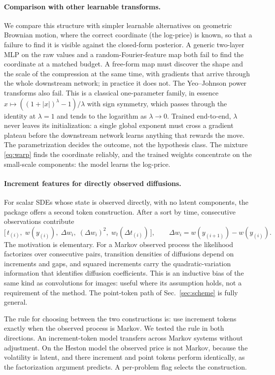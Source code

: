 \documentclass[10pt]{article}
\begin{document}
\paragraph{Comparison with other learnable transforms.} We compare this structure with simpler
learnable alternatives on geometric Brownian motion, where the correct coordinate (the log-price) is
known, so that a failure to find it is visible against the closed-form posterior. A generic two-layer
MLP on the raw values and a random-Fourier-feature map both fail to find the coordinate at a matched
budget. A free-form map must discover the shape and the scale of the compression at the same time,
with gradients that arrive through the whole downstream network; in practice it does not. The
Yeo--Johnson power transforms \citep{yeo2000} also fail. This is a classical one-parameter family, in
essence $x \mapsto ((1+|x|)^{\lambda} - 1)/\lambda$ with sign symmetry, which passes through the
identity at $\lambda = 1$ and tends to the logarithm as $\lambda \to 0$. Trained end-to-end, $\lambda$
never leaves its initialization: a single global exponent must cross a gradient plateau before the
downstream network learns anything that rewards the move. The parametrization decides the outcome,
not the hypothesis class. The mixture \eqref{eq:warp} finds the coordinate reliably, and the trained
weights concentrate on the small-scale components: the model learns the log-price.

\paragraph{Increment features for directly observed diffusions.} For scalar SDEs whose state is
observed directly, with no latent components, the package offers a second token construction. After a
sort by time, consecutive observations contribute
\[
  \bigl[\,t_{(i)},\; w(y_{(i)}),\; \Delta w_i,\; (\Delta w_i)^2,\; w_t(\Delta t_{(i)})\,\bigr],
  \qquad \Delta w_i = w(y_{(i+1)}) - w(y_{(i)}).
\]
The motivation is elementary. For a Markov observed process the likelihood factorizes over
consecutive pairs, transition densities of diffusions depend on increments and gaps, and squared
increments carry the quadratic-variation information that identifies diffusion coefficients. This is
an inductive bias of the same kind as convolutions for images: useful where its assumption holds, not
a requirement of the method. The point-token path of Sec.~\ref{sec:scheme} is fully general.

The rule for choosing between the two constructions is: use increment tokens exactly when the observed
process is Markov. We tested the rule in both directions. An increment-token model transfers across
Markov systems without adjustment. On the Heston model the observed price is not Markov, because the
volatility is latent, and there increment and point tokens perform identically, as the factorization
argument predicts. A per-problem flag selects the construction.
\end{document}
